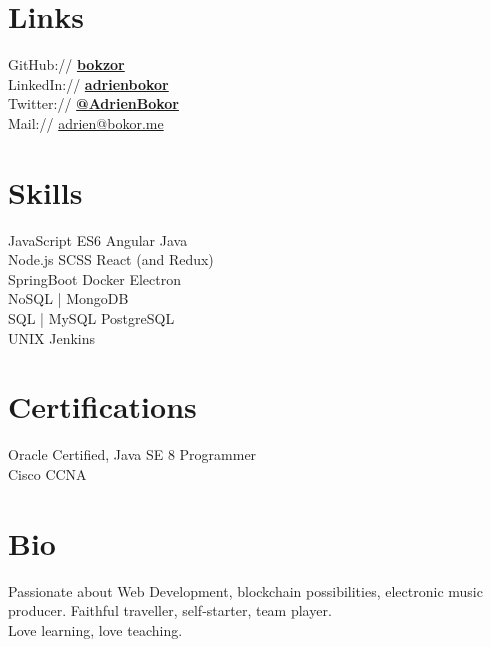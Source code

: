 \documentclass[]{my-resume}
\begin{document}
\begin{minipage}[t]{0.33\textwidth} 



\section{Links} 
GitHub:// \href{https://github.com/bokzor}{\bf bokzor} \\
LinkedIn:// \href{https://www.linkedin.com/in/adrienbokor}{\bf adrienbokor} \\
Twitter:// \href{https://twitter.com/adrienbokor}{\bf @AdrienBokor} \\
Mail:// \href{mailto:adrien@bokor.me}{adrien@bokor.me}
\sectionsep


\section{Skills}
JavaScript ES6 \textbullet{} Angular \textbullet{} Java \\
Node.js \textbullet{} SCSS \textbullet{} React (and Redux)  \\ 
\textbullet{} SpringBoot \textbullet{} Docker  \textbullet{} Electron \\
NoSQL | MongoDB \\
SQL | MySQL \textbullet{} PostgreSQL \\
UNIX \textbullet{} Jenkins
\sectionsep


\section{Certifications}
Oracle Certified, Java SE 8 Programmer \\
Cisco CCNA
\sectionsep


\section{Bio}
Passionate about Web Development, blockchain possibilities, electronic music producer.
Faithful traveller, self-starter, team player.\\
Love learning, love teaching.
\sectionsep


\end{minipage} 
\end{document}
